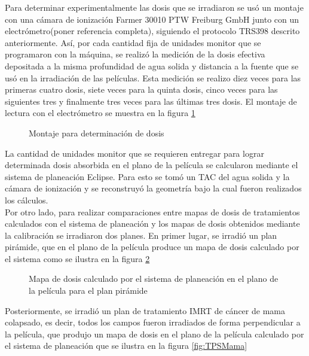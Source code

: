 Para determinar experimentalmente las dosis que se irradiaron se usó un montaje con una cámara de ionización Farmer 30010 PTW Freiburg GmbH junto con un electrómetro(poner referencia completa), siguiendo el protocolo TRS398 descrito anteriormente. Así, por cada cantidad fija de unidades monitor que se programaron con la máquina, se realizó la medición de la dosis efectiva depositada a la misma profundidad de agua solida y distancia a la fuente que se usó en la irradiación de las películas. Esta medición se realizo diez veces para las primeras cuatro dosis, siete veces para la quinta dosis, cinco veces para las siguientes tres y finalmente tres veces para las últimas tres dosis. El montaje de lectura con el electrómetro se muestra en la figura \ref{fig:Montajeelectrometro}\\
\begin{figure}
	\centering
	
	\caption{Montaje para determinación de dosis}
	\label{fig:Montajeelectrometro}
\end{figure}
La cantidad de unidades monitor que se requieren entregar para lograr determinada dosis absorbida en el plano de la película se calcularon mediante el sistema de planeación Eclipse. Para esto se tomó un TAC del agua solida y la cámara de ionización y se reconstruyó la geometría bajo la cual fueron realizados los cálculos.\\

Por otro lado, para realizar comparaciones entre mapas de dosis de tratamientos calculados con el sistema de planeación y los mapas de dosis obtenidos mediante la calibración  se irradiaron dos planes. En primer lugar, se irradió un plan pirámide, que en el plano de la película produce un mapa de dosis calculado por el sistema como se ilustra en la figura \ref{fig:TPSPiramide}

\begin{figure}
	\centering
	
	\caption{Mapa de dosis calculado por el sistema de planeación en el plano de la película para el plan pirámide}
	\label{fig:TPSPiramide}
\end{figure}

Posteriormente, se irradió un plan de tratamiento IMRT de cáncer de mama colapsado, es decir, todos los campos fueron irradiados de forma perpendicular a la película, que produjo un mapa de dosis en el plano de la película calculado por el sistema de planeación que se ilustra en la figura \ref{fig:TPSMama}


